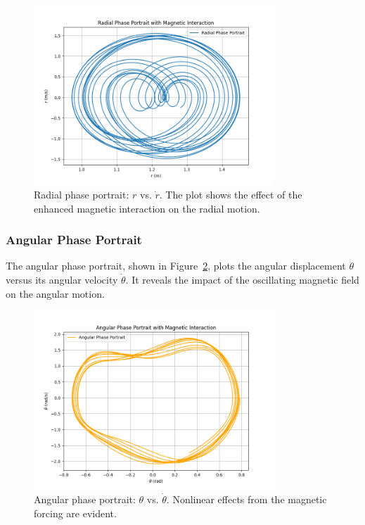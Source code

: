 \documentclass[12pt]{article}
\begin{document}
\begin{figure}[h!]
    \centering
    \includegraphics[width=0.8\textwidth]{radial_phase_portrait_magnetic.png}
    \caption{Radial phase portrait: \( r \) vs. \( \dot{r} \). The plot shows the effect of the enhanced magnetic interaction on the radial motion.}
    \label{fig:radial_phase_portrait_magnetic}
\end{figure}

\subsubsection{Angular Phase Portrait}
The angular phase portrait, shown in Figure~\ref{fig:angular_phase_portrait_magnetic}, plots the angular displacement \( \theta \) versus its angular velocity \( \dot{\theta} \). It reveals the impact of the oscillating magnetic field on the angular motion.

\begin{figure}[h!]
    \centering
    \includegraphics[width=0.8\textwidth]{angular_phase_portrait_magnetic.png}
    \caption{Angular phase portrait: \( \theta \) vs. \( \dot{\theta} \). Nonlinear effects from the magnetic forcing are evident.}
    \label{fig:angular_phase_portrait_magnetic}
\end{figure}
\end{document}
